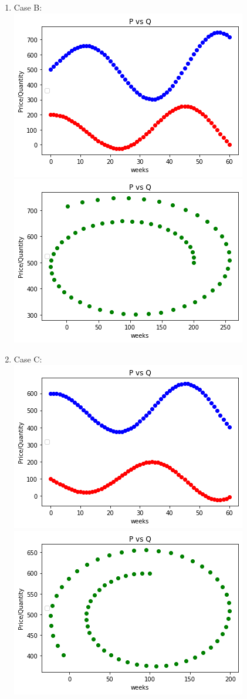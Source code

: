 \documentclass[12pt,letterpaper]{article}
\begin{document}
\begin{enumerate}
\begin{enumerate}
  \item Case B: \\ \includegraphics[scale = .5]{1.4 6 b1.png}
  \includegraphics[scale = .5]{1.4 6 b2.png}
  \item Case C: \\ \includegraphics[scale = .5]{1.4 6 c2.png}
  \includegraphics[scale = .5]{1.4 6 c1.png}

\end{enumerate}
\end{enumerate}
\end{document}
